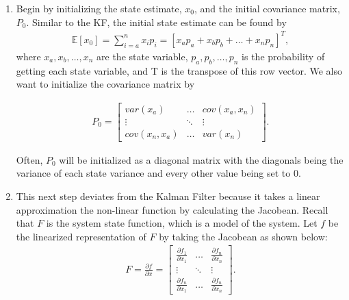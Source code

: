 \begin{enumerate}
  \item Begin by initializing the state estimate, $x_0$, and the initial covariance matrix, $P_0$. Similar to the KF, the initial state estimate can be found by 
  \begin{align*}
           \mathbb{E}[x_0]   = \sum^n_{i = a} x_i p_i = [x_a p_a + x_b p_b + \hdots + x_n p_n]^T,
      \end{align*}
 \noindent where  $x_a, x_b, \hdots, x_n$ are the state variable, $p_a, p_b, \hdots, p_n$ is the probability of getting each state variable, and T is the transpose of this row vector. We also want to initialize the covariance matrix by

    
  \begin{align*}
      P_0 =
      \begin{bmatrix}
           var(x_a)  & \hdots & cov(x_a,x_n) \\
           \vdots & \ddots & \vdots \\
           cov(x_n, x_a)  & \hdots & var(x_n )
         \end{bmatrix} .
  \end{align*}  
  
  Often, $P_0 $ will be initialized as a diagonal matrix with the diagonals being the variance of each state variance and every other value being set to 0.
  
  
  \item This next step deviates from the Kalman Filter because it takes a linear approximation the non-linear function by calculating the Jacobean. Recall that $F$ is the system state function, which is a model of the system. Let $f$ be the linearized representation of $F$ by taking the Jacobean as shown below:
  \begin{align*}
      F= \frac{\partial f}{\partial x} =
      \begin{bmatrix}
           \frac{\partial f_1}{\partial x_1} & \hdots & \frac{\partial f_n}{\partial x_n} \\
           \vdots & \ddots & \vdots \\
           \frac{\partial f_n}{\partial x_1}  & \hdots & \frac{\partial f_n}{\partial x_n}
         \end{bmatrix}  .
  \end{align*}
  

\end{enumerate}
